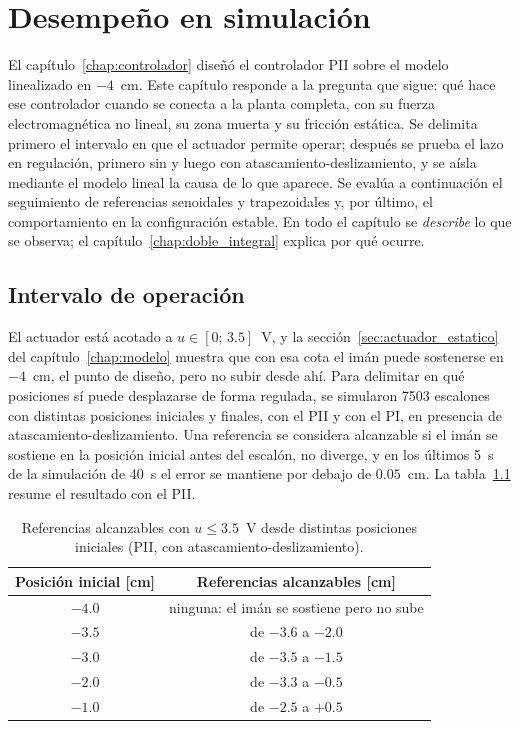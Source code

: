 \chapter{Desempeño en simulación}\label{chap:desempeno}

El capítulo~\ref{chap:controlador} diseñó el controlador PII sobre el modelo linealizado en $-4$~cm. Este capítulo responde a la pregunta que sigue: qué hace ese controlador cuando se conecta a la planta completa, con su fuerza electromagnética no lineal, su zona muerta y su fricción estática. Se delimita primero el intervalo en que el actuador permite operar; después se prueba el lazo en regulación, primero sin y luego con atascamiento-deslizamiento, y se aísla mediante el modelo lineal la causa de lo que aparece. Se evalúa a continuación el seguimiento de referencias senoidales y trapezoidales y, por último, el comportamiento en la configuración estable. En todo el capítulo se \emph{describe} lo que se observa; el capítulo~\ref{chap:doble_integral} explica por qué ocurre.

\section{Intervalo de operación}
\label{sec:intervalo}

El actuador está acotado a $u\in[0;\,3.5]$~V, y la sección~\ref{sec:actuador_estatico} del capítulo~\ref{chap:modelo} muestra que con esa cota el imán puede sostenerse en $-4$~cm, el punto de diseño, pero no subir desde ahí. Para delimitar en qué posiciones sí puede desplazarse de forma regulada, se simularon 7503 escalones con distintas posiciones iniciales y finales, con el PII y con el PI, en presencia de atascamiento-deslizamiento. Una referencia se considera alcanzable si el imán se sostiene en la posición inicial antes del escalón, no diverge, y en los últimos 5~s de la simulación de 40~s el error se mantiene por debajo de $0.05$~cm. La tabla~\ref{tab:intervalo} resume el resultado con el PII.

\begin{table}[ht]
\centering
\caption{Referencias alcanzables con $u\le3.5$~V desde distintas posiciones iniciales (PII, con atascamiento-deslizamiento).}
\label{tab:intervalo}
\begin{tabular}{|c|c|}
\hline
Posición inicial [cm] & Referencias alcanzables [cm] \\ \hline
$-4.0$ & ninguna: el imán se sostiene pero no sube \\ \hline
$-3.5$ & de $-3.6$ a $-2.0$ \\ \hline
$-3.0$ & de $-3.5$ a $-1.5$ \\ \hline
$-2.0$ & de $-3.3$ a $-0.5$ \\ \hline
$-1.0$ & de $-2.5$ a $+0.5$ \\ \hline
\end{tabular}
\end{table}

